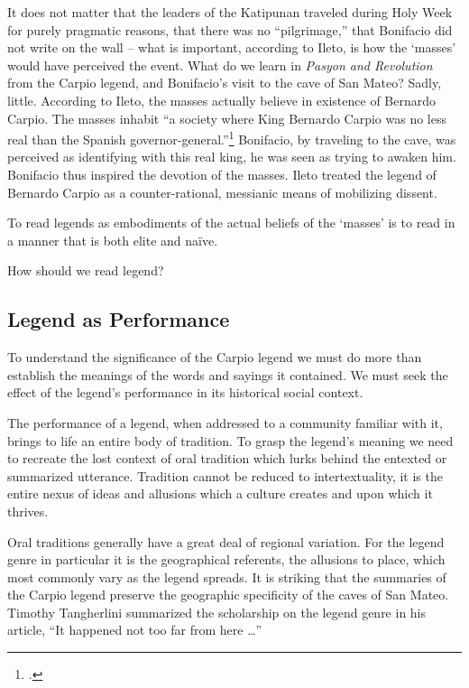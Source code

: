 It does not matter that the leaders of the Katipunan traveled during Holy Week for purely pragmatic reasons, that there was no \enquote{pilgrimage,} that Bonifacio did not write on the wall -- what is important, according to Ileto, is how the \enquote*{masses} would have perceived the event. What do we learn in \textit{Pasyon and Revolution} from the Carpio legend, and Bonifacio's visit to the cave of San Mateo? Sadly, little. According to Ileto, the masses actually believe in existence of Bernardo Carpio. The masses inhabit \enquote{a society where King Bernardo Carpio was no less real than the Spanish governor-general.}\footcite[63]{Ileto1982} Bonifacio, by traveling to the cave, was perceived as identifying with this real king, he was seen as trying to awaken him. Bonifacio thus inspired the devotion of the masses. Ileto treated the legend of Bernardo Carpio as a counter-rational, messianic means of mobilizing dissent. 

To read legends as embodiments of the actual beliefs of the \enquote*{masses} is to read in a manner that is both elite and na\"ive.

How should we read legend?

\subsection{Legend as Performance}

To understand the significance of the Carpio legend we must do more than establish the meanings of the words and sayings it contained. We must seek the effect of the legend's performance in its historical social context.  

The performance of a legend, when addressed to a community familiar with it, brings to life an entire body of tradition. To grasp the legend's meaning we need to recreate the lost context of oral tradition which lurks behind the entexted or summarized utterance.  Tradition cannot be reduced to intertextuality, it is the entire nexus of ideas and allusions which a culture creates and upon which it thrives.

Oral traditions generally have a great deal of regional variation. For the legend genre in particular it is the geographical referents, the allusions to place, which most commonly vary as the legend spreads. It is striking that the summaries of the Carpio legend preserve the geographic specificity of the caves of San Mateo. Timothy Tangherlini summarized the scholarship on the legend genre in his article, \enquote{It happened not too far from here \ldots}

